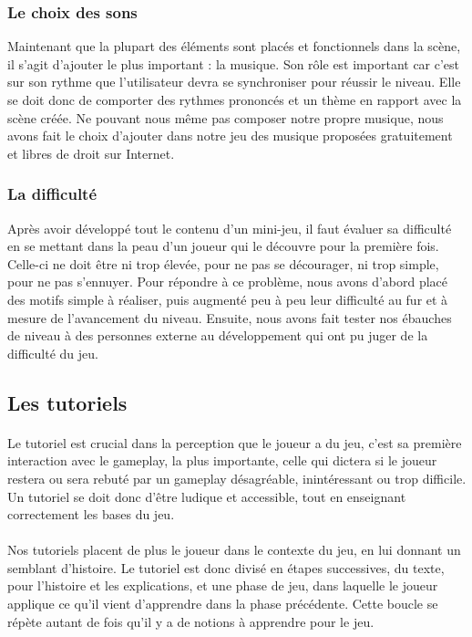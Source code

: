 \subsubsection{Le choix des sons}

Maintenant que la plupart des éléments sont placés et fonctionnels dans la scène, il s'agit d'ajouter le plus important : la musique. Son rôle est important car c'est sur son rythme que l'utilisateur devra se synchroniser pour réussir le niveau. Elle se doit donc de comporter des rythmes prononcés et un thème en rapport avec la scène créée.
Ne pouvant nous même pas composer notre propre musique, nous avons fait le choix d'ajouter dans notre jeu des musique proposées gratuitement et libres de droit sur Internet.

\subsubsection{La difficulté}

Après avoir développé tout le contenu d'un mini-jeu, il faut évaluer sa difficulté en se mettant dans la peau d'un joueur qui le découvre pour la première fois. Celle-ci ne doit être ni trop élevée, pour ne pas se décourager, ni trop simple, pour ne pas s'ennuyer. Pour répondre à ce problème, nous avons d'abord placé des motifs simple à réaliser, puis augmenté peu à peu leur difficulté au fur et à mesure de l'avancement du niveau. Ensuite, nous avons fait tester nos ébauches de niveau à des personnes externe au développement qui ont pu juger de la difficulté du jeu.


\subsection{Les tutoriels}

\paragraph{}
Le tutoriel est crucial dans la perception que le joueur a du jeu, c'est sa première interaction avec le gameplay, la plus importante, celle qui dictera si le joueur restera ou sera rebuté par un gameplay désagréable, inintéressant ou trop difficile. Un tutoriel se doit donc d'être ludique et accessible, tout en enseignant correctement les bases du jeu.

\paragraph{}
Nos tutoriels placent de plus le joueur dans le contexte du jeu, en lui donnant un semblant d'histoire. Le tutoriel est donc divisé en étapes successives, du texte, pour l'histoire et les explications, et une phase de jeu, dans laquelle le joueur applique ce qu'il vient d'apprendre dans la phase précédente. Cette boucle se répète autant de fois qu'il y a de notions à apprendre pour le jeu.

